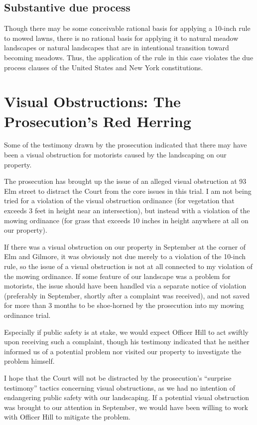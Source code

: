 \documentclass[12pt]{article}
\begin{document}
\subsection{Substantive due process}
Though there may be some conceivable rational basis for applying a 10-inch rule to mowed lawns, there is no rational basis for applying it to natural meadow landscapes or natural landscapes that are in intentional transition toward becoming meadows.
Thus, the application of the rule in this case violates the due process clauses of the United States and New York constitutions.

\section{Visual Obstructions:  The Prosecution's Red Herring}

Some of the testimony drawn by the prosecution indicated that there may have been a visual obstruction for motorists caused by the landscaping on our property.

The prosecution has brought up the issue of an alleged visual obstruction at 93 Elm street to distract the Court from the core issues in this trial.
I am not being tried for a violation of the visual obstruction ordinance (for vegetation that exceeds 3 feet in height near an intersection), but instead with a violation of the mowing ordinance (for grass that exceeds 10 inches in height anywhere at all on our property).

If there was a visual obstruction on our property in September at the corner of Elm and Gilmore, it was obviously not due merely to a violation of the 10-inch rule, so the issue of a visual obstruction is not at all connected to my violation of the mowing ordinance.
If some feature of our landscape was a problem for motorists, the issue should have been handled via a separate notice of violation (preferably in September, shortly after a complaint was received), and not saved for more than 3 months to be shoe-horned by the prosecution into my mowing ordinance trial.

Especially if public safety is at stake, we would expect Officer Hill to act swiftly upon receiving such a complaint, though his testimony indicated that he neither informed us of a potential problem nor visited our property to investigate the problem himself.

I hope that the Court will not be distracted by the prosecution's ``surprise testimony'' tactics concerning visual obstructions, as we had no intention of endangering public safety with our landscaping.
If a potential visual obstruction was brought to our attention in September, we would have been willing to work with Officer Hill to mitigate the problem.
\end{document}
